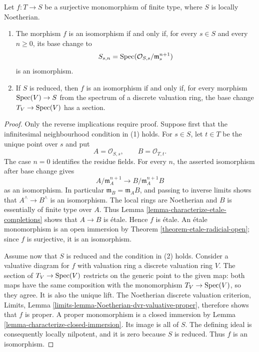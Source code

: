 \begin{lemma}
\label{lemma-surjective-monomorphism-tests}
Let $f : T \to S$ be a surjective monomorphism of finite type, where $S$ is
locally Noetherian.
\begin{enumerate}
\item The morphism $f$ is an isomorphism if and only if, for every $s \in S$
and every $n \geq 0$, its base change to
$$
S_{s, n} =
\mathop{\mathrm{Spec}}(\mathcal{O}_{S, s}/\mathfrak m_s^{n + 1})
$$
is an isomorphism.
\item If $S$ is reduced, then $f$ is an isomorphism if and only if, for every
morphism $\mathop{\mathrm{Spec}}(V) \to S$ from the spectrum of a discrete valuation ring,
the base change $T_V \to \mathop{\mathrm{Spec}}(V)$ has a section.
\end{enumerate}
\end{lemma}

\begin{proof}
Only the reverse implications require proof. Suppose first that the
infinitesimal neighbourhood condition in (1) holds. For $s \in S$, let
$t \in T$ be the unique point over $s$ and put
$$
A = \mathcal{O}_{S, s}, \qquad B = \mathcal{O}_{T, t}.
$$
The case $n = 0$ identifies the residue fields. For every $n$, the asserted
isomorphism after base change gives
$$
A/\mathfrak m_A^{n + 1}
\longrightarrow
B/\mathfrak m_A^{n + 1}B
$$
as an isomorphism. In particular $\mathfrak m_B = \mathfrak m_A B$, and
passing to inverse limits shows that $A^\wedge \to B^\wedge$ is an
isomorphism. The local rings are Noetherian and $B$ is essentially of finite
type over $A$. Thus
Lemma \ref{lemma-characterize-etale-completions} shows that $A \to B$ is
\'etale. Hence $f$ is \'etale. An \'etale monomorphism is an open immersion by
Theorem \ref{theorem-etale-radicial-open}; since $f$ is surjective, it is an
isomorphism.

Assume now that $S$ is reduced and the condition in (2) holds. Consider a
valuative diagram for $f$ with valuation ring a discrete valuation ring $V$.
The section of $T_V \to \mathop{\mathrm{Spec}}(V)$ restricts on the generic point to the given
map: both maps have the same composition with the monomorphism $T_V \to
\mathop{\mathrm{Spec}}(V)$, so they agree. It is also the unique lift. The Noetherian discrete
valuation criterion, Limits, Lemma
\ref{limits-lemma-Noetherian-dvr-valuative-proper}, therefore shows that $f$
is proper. A proper monomorphism is a closed immersion by
Lemma \ref{lemma-characterize-closed-immersion}. Its image is all of $S$.
The defining ideal is consequently locally nilpotent, and it is zero because
$S$ is reduced. Thus $f$ is an isomorphism.
\end{proof}

